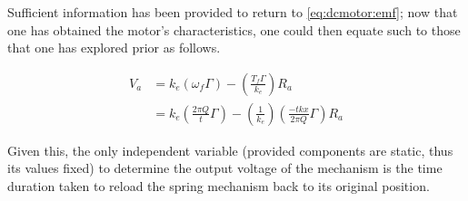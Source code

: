 \documentclass[conference]{IEEEtran}
\begin{document}
Sufficient information has been provided to return to \eqref{eq:dcmotor:emf}; now that one has obtained the motor's characteristics, one could then equate such to those that one has explored prior as follows.

\begin{align*}
    V_a &= k_e(\omega_{f} \Gamma) - \left(\frac{T_{f}\Gamma}{k_e}\right)R_a \\
    &=  k_e\left(\frac{2\pi Q}{t} \Gamma\right) - \left(\frac{1}{k_e}\right)\left(\frac{-tkx}{2\pi Q}\Gamma\right)R_a
\end{align*}

Given this, the only independent variable (provided components are static, thus its values fixed) to determine the output voltage of the mechanism is the time duration taken to reload the spring mechanism back to its original position.







\medskip


\end{document}

